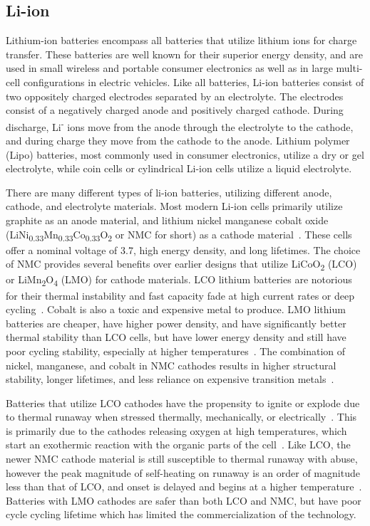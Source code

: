 \subsection{Li-ion}
Lithium-ion batteries encompass all batteries that utilize lithium ions for charge transfer. These batteries are well known for their superior energy density, and are used in small wireless and portable consumer electronics as well as in large multi-cell configurations in electric vehicles.
Like all batteries, Li-ion batteries consist of two oppositely charged electrodes separated by an electrolyte. The electrodes consist of a negatively charged anode and positively charged cathode. During discharge, Li\textsuperscript{-} ions move from the anode through the electrolyte to the cathode, and during charge they move from the cathode to the anode.
Lithium polymer (Lipo) batteries, most commonly used in consumer electronics, utilize a dry or gel electrolyte, while coin cells or cylindrical Li-ion cells utilize a liquid electrolyte. 

There are many different types of li-ion batteries, utilizing different anode, cathode, and electrolyte materials. Most modern Li-ion cells primarily utilize graphite as an anode material, and lithium nickel manganese cobalt oxide
(LiNi\textsubscript{0.33}Mn\textsubscript{0.33}Co\textsubscript{0.33}O\textsubscript{2} or NMC for short) as a cathode material~\cite{nitta2015li}.
These cells offer a nominal voltage of 3.7\ssi{\volt}, high energy density, and long lifetimes. 
The choice of NMC provides several benefits over earlier designs that utilize 
LiCoO\textsubscript{2} (LCO) or LiMn\textsubscript{2}O\textsubscript{4} (LMO) for cathode materials.
LCO lithium batteries are notorious for their thermal instability and fast capacity fade at high current rates or deep cycling~\cite{nitta2015li}. 
Cobalt is also a toxic and expensive metal to produce. 
LMO lithium batteries are cheaper, have higher power density, and have significantly better thermal stability than LCO cells, but have lower energy density and still have poor cycling stability, especially at higher temperatures~\cite{nitta2015li}.
The combination of nickel, manganese, and cobalt in NMC cathodes results in higher structural stability, longer lifetimes, and less reliance on expensive transition metals~\cite{nitta2015li}. 

Batteries that utilize LCO cathodes have the propensity to ignite or explode due to thermal runaway when stressed thermally, mechanically, or electrically~\cite{doughty2012general}. This is primarily due to the cathodes releasing oxygen at high temperatures, which start an exothermic reaction with the organic parts of the cell~\cite{doughty2012general, nitta2015li}. Like LCO, the newer NMC cathode material is still susceptible to thermal runaway with abuse, however the peak magnitude of self-heating on runaway is an order of magnitude less than that of LCO, and onset is delayed and begins at a higher temperature~\cite{doughty2012general}.
Batteries with LMO cathodes are safer than both LCO and NMC, but have poor cycle cycling lifetime which has limited the commercialization of the technology. 

